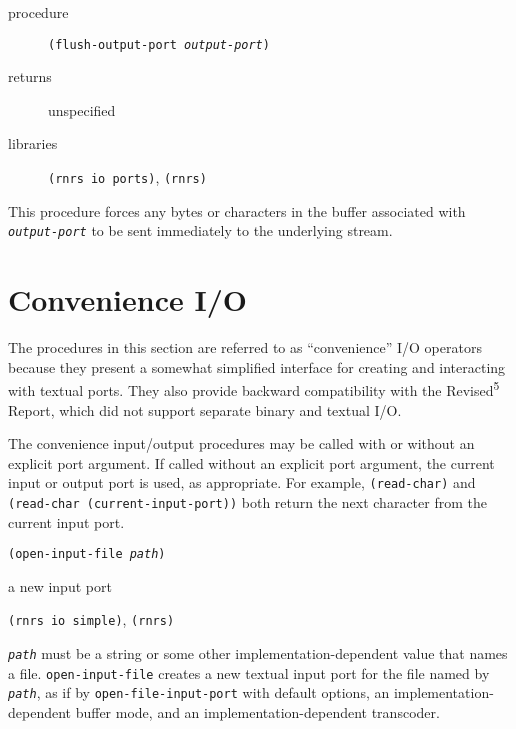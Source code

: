 \begin{description}

\label{io_s74}\item[procedure] \texttt{(flush-output-port \textit{output-port})}



\item[returns] unspecified


\item[libraries] \texttt{(rnrs io ports)}, \texttt{(rnrs)}
\end{description}


This procedure forces any bytes or characters in the buffer associated
with \texttt{\textit{output-port}} to be sent immediately to the underlying stream.



\section{\label{io_g130}\label{io_h9}Convenience I/O\label{io_SECTCONVENIENCE}}



The procedures in this section are referred to as ``convenience''
I/O operators because they present a somewhat simplified interface for
creating and interacting with textual ports.
They also provide backward compatibility with the Revised\textsuperscript{5} Report,
which did not support separate binary and textual I/O.


The convenience input/output procedures may be called with
or without an explicit port argument.
If called without an explicit port argument, the current input or output
port is used, as appropriate.
For example, \texttt{(read-char)} and \texttt{(read-char (current-input-port))}
both return the next character from the current input port.


\begin{description}

\label{io_s75}\item[procedure] \texttt{(open-input-file \textit{path})}



\item[returns] a new input port


\item[libraries] \texttt{(rnrs io simple)}, \texttt{(rnrs)}
\end{description}

\texttt{\textit{path}} must be a string or some other implementation-dependent 
value that names a file.
\texttt{open-input-file} creates a new textual input port for the file named by
\texttt{\textit{path}}, as if by \texttt{open-file-input-port}
with default options, an implementation-dependent buffer
mode, and an implementation-dependent transcoder.

